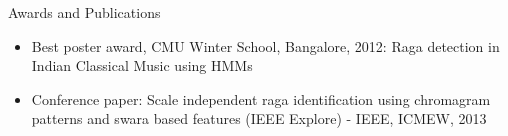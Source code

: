\documentclass{resume} %
\begin{document}
\begin{rSection}{Awards and Publications}
  \begin{itemize}
    \item Best poster award, CMU Winter School, Bangalore, 2012: Raga detection in Indian Classical Music using HMMs
    \item Conference paper: Scale independent raga identification using chromagram patterns and swara based features (IEEE Explore) - IEEE, ICMEW, 2013
  \end{itemize}
\end{rSection}
\end{document}

